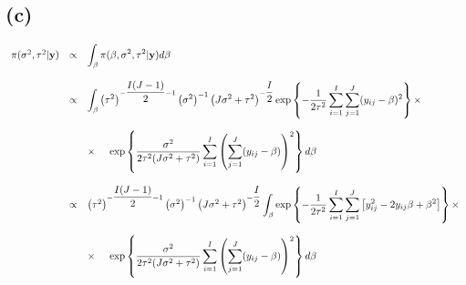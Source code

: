 \documentclass{article}
\begin{document}
\subsection{(c)}

\begin{equation*}
\begin{array}{lcl ll }
\pi(\sigma^2, \tau^2|\textbf{y}) & \propto & \displaystyle\int_{\beta} \pi(\beta, \sigma^2, \tau^2|\textbf{y}) d\beta  \\\\

& \propto & \displaystyle\int_{\beta} \left(\tau^2\right)^{-\dfrac{I(J-1)}{2} -1} \left(\sigma^2\right)^{-1} \left(J\sigma^2 + \tau^2\right)^{-\dfrac{I}{2}}  \mbox{exp}\left\{ - \dfrac{1}{2\tau^2} \displaystyle\sum_{i=1}^{I}\sum_{j=1}^{J}(y_{ij} - \beta)^2 \right\} \times \\ \\

& & \times \hspace{0.5cm} \mbox{exp}\left\{ \dfrac{\sigma^2}{2\tau^2(J\sigma^2 + \tau^2)}\displaystyle\sum_{i=1}^{I}\left(\sum_{j=1}^{J} (y_{ij} - \beta)\right)^2 \right\}d\beta\\\\

& \propto & \left(\tau^2\right)^{-\dfrac{I(J-1)}{2} -1} \left(\sigma^2\right)^{-1} \left(J\sigma^2 + \tau^2\right)^{-\dfrac{I}{2}} \displaystyle\int_{\beta} \mbox{exp}\left\{ - \dfrac{1}{2\tau^2} \displaystyle\sum_{i=1}^{I}\sum_{j=1}^{J}\left[ y_{ij}^2 - 2y_{ij}\beta + \beta^2 \right] \right\} \times \\ \\

& & \times \hspace{0.5cm} \mbox{exp}\left\{\dfrac{\sigma^2}{2\tau^2(J\sigma^2 + \tau^2)}\displaystyle\sum_{i=1}^{I}\left(\sum_{j=1}^{J} (y_{ij} - \beta)\right)^2 \right\}d\beta\\\\

 \end{array}
\end{equation*}
\end{document}
